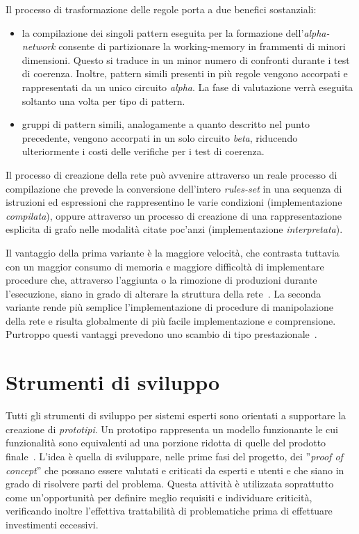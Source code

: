 Il processo di trasformazione delle regole porta a due benefici sostanziali:
\begin{itemize}
	\item la compilazione dei singoli pattern eseguita per la formazione dell'\emph{alpha-network} consente di partizionare la working-memory in frammenti di minori dimensioni. Questo si traduce in un minor numero di confronti durante i test di coerenza. Inoltre, pattern simili presenti in più regole vengono accorpati e rappresentati da un unico circuito \emph{alpha}. La fase di valutazione verrà eseguita soltanto una volta per tipo di pattern.
	\item gruppi di pattern simili, analogamente a quanto descritto nel punto precedente, vengono accorpati in un solo circuito \emph{beta}, riducendo ulteriormente i costi delle verifiche per i test di coerenza.
\end{itemize}

Il processo di creazione della rete può avvenire attraverso un reale processo di compilazione \cite{forgy1982} che prevede la conversione dell'intero \emph{rules-set} in una sequenza di istruzioni ed espressioni che rappresentino le varie condizioni (implementazione \emph{compilata}), oppure attraverso un processo di creazione di una rappresentazione esplicita di grafo nelle modalità citate poc'anzi (implementazione \emph{interpretata}). 

Il vantaggio della prima variante è la maggiore velocità, che contrasta tuttavia con un maggior consumo di memoria e maggiore difficoltà di implementare procedure che, attraverso l'aggiunta o la rimozione di produzioni durante l'esecuzione, siano in grado di alterare la struttura della rete~\cite{Doorenbos95productionmatching}.
La seconda variante rende più semplice l'implementazione di procedure di manipolazione della rete e risulta globalmente di più facile implementazione e comprensione. Purtroppo questi vantaggi prevedono uno scambio di tipo prestazionale~\cite{Doorenbos95productionmatching}.

\section{Strumenti di sviluppo}


Tutti gli strumenti di sviluppo per sistemi esperti sono orientati a supportare la creazione di \emph{prototipi}. Un prototipo rappresenta un modello funzionante le cui funzionalità sono equivalenti ad una porzione ridotta di quelle del prodotto finale~\cite{jackson1999}.
L'idea è quella di sviluppare, nelle prime fasi del progetto, dei ''\emph{proof of concept}'' che possano essere valutati e criticati da esperti e utenti e che siano in grado di risolvere parti del problema. Questa attività è utilizzata soprattutto come un'opportunità per definire meglio requisiti e individuare criticità, verificando inoltre l'effettiva trattabilità di problematiche prima di effettuare investimenti eccessivi.


